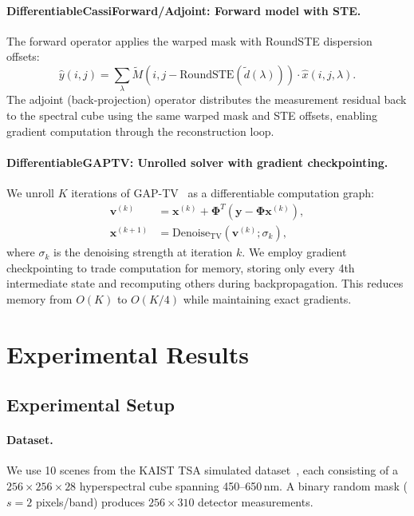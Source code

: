 \documentclass[runningheads]{llncs}
\begin{document}
\paragraph{DifferentiableCassiForward/Adjoint: Forward model with STE.}
The forward operator applies the warped mask with RoundSTE dispersion offsets:
\begin{equation}
    \hat{y}(i, j) = \sum_{\lambda} \tilde{M}(i, j - \text{RoundSTE}(\tilde{d}(\lambda))) \cdot \hat{x}(i, j, \lambda).
    \label{eq:diff_forward}
\end{equation}
The adjoint (back-projection) operator distributes the measurement residual back to the spectral cube using the same warped mask and STE offsets, enabling gradient computation through the reconstruction loop.

\paragraph{DifferentiableGAPTV: Unrolled solver with gradient checkpointing.}
We unroll $K$ iterations of GAP-TV~\cite{yuan2016gaptv} as a differentiable computation graph:
\begin{align}
    \mathbf{v}^{(k)} &= \mathbf{x}^{(k)} + \mathbf{\Phi}^T(\mathbf{y} - \mathbf{\Phi}\mathbf{x}^{(k)}), \label{eq:gap1} \\
    \mathbf{x}^{(k+1)} &= \text{Denoise}_{\text{TV}}(\mathbf{v}^{(k)}; \sigma_k), \label{eq:gap2}
\end{align}
where $\sigma_k$ is the denoising strength at iteration $k$.
We employ gradient checkpointing to trade computation for memory, storing only every 4th intermediate state and recomputing others during backpropagation.
This reduces memory from $O(K)$ to $O(K/4)$ while maintaining exact gradients.

\section{Experimental Results}
\label{sec:results}

\subsection{Experimental Setup}
\label{sec:setup}

\paragraph{Dataset.}
We use 10 scenes from the KAIST TSA simulated dataset~\cite{choi2017kaist}, each consisting of a $256 \times 256 \times 28$ hyperspectral cube spanning 450--650\,nm.
A binary random mask ($s = 2$ pixels/band) produces $256 \times 310$ detector measurements.
\end{document}
